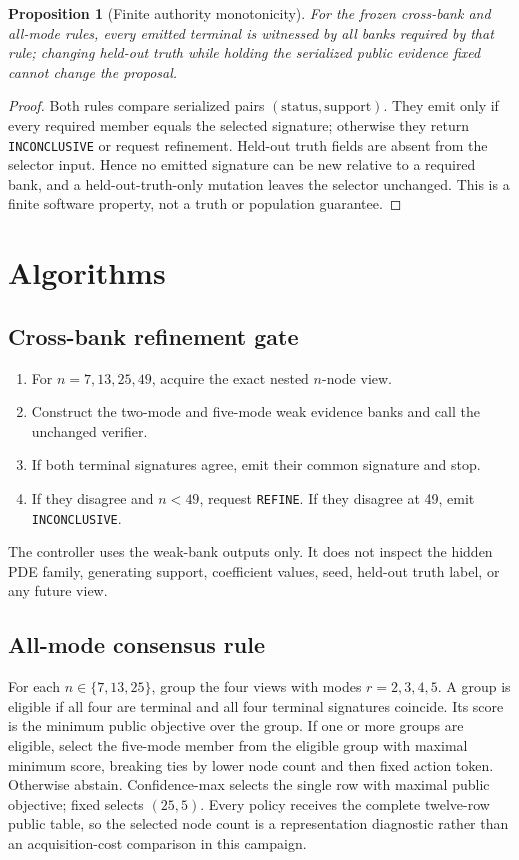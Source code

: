 \documentclass{article}
\newcommand{\INC}{\texttt{INCONCLUSIVE}\xspace}
\newcommand{\REFINE}{\texttt{REFINE}\xspace}
\newtheorem{proposition}{Proposition}
\begin{document}
\begin{proposition}[Finite authority monotonicity]
For the frozen cross-bank and all-mode rules, every emitted terminal is witnessed by all banks
required by that rule; changing held-out truth while holding the serialized public evidence fixed
cannot change the proposal.
\end{proposition}
\begin{proof}
Both rules compare serialized pairs $(\mathrm{status},\mathrm{support})$. They emit only if every
required member equals the selected signature; otherwise they return \INC or request refinement.
Held-out truth fields are absent from the selector input. Hence no emitted signature can be new relative to
a required bank, and a held-out-truth-only mutation leaves the selector unchanged. This is a finite
software property, not a truth or population guarantee.
\end{proof}

\section{Algorithms}

\subsection{Cross-bank refinement gate}
\begin{enumerate}[leftmargin=*]
\item For $n=7,13,25,49$, acquire the exact nested $n$-node view.
\item Construct the two-mode and five-mode weak evidence banks and call the unchanged verifier.
\item If both terminal signatures agree, emit their common signature and stop.
\item If they disagree and $n<49$, request \REFINE. If they disagree at 49, emit \INC.
\end{enumerate}
The controller uses the weak-bank outputs only. It does not inspect the hidden PDE family,
generating support, coefficient values, seed, held-out truth label, or any future view.

\subsection{All-mode consensus rule}
For each $n\in\{7,13,25\}$, group the four views with modes $r=2,3,4,5$. A group is eligible if
all four are terminal and all four terminal signatures coincide. Its score is the minimum public
objective over the group. If one or more groups are eligible, select the five-mode member from the
eligible group with maximal minimum score, breaking ties by lower node count and then fixed action
token. Otherwise abstain. Confidence-max selects the single row with maximal public objective;
fixed selects $(25,5)$. Every policy receives the complete twelve-row public table, so the selected
node count is a representation diagnostic rather than an acquisition-cost comparison in this
campaign.
\end{document}
